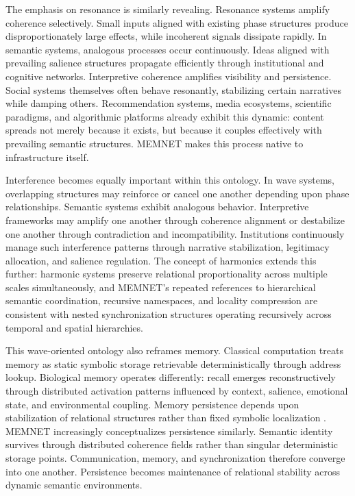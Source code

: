 \documentclass[11pt,a4paper]{article}
\begin{document}
The emphasis on resonance is similarly revealing. Resonance systems amplify coherence selectively. Small inputs aligned with existing phase structures produce disproportionately large effects, while incoherent signals dissipate rapidly. In semantic systems, analogous processes occur continuously. Ideas aligned with prevailing salience structures propagate efficiently through institutional and cognitive networks. Interpretive coherence amplifies visibility and persistence. Social systems themselves often behave resonantly, stabilizing certain narratives while damping others. Recommendation systems, media ecosystems, scientific paradigms, and algorithmic platforms already exhibit this dynamic: content spreads not merely because it exists, but because it couples effectively with prevailing semantic structures. MEMNET makes this process native to infrastructure itself.

Interference becomes equally important within this ontology. In wave systems, overlapping structures may reinforce or cancel one another depending upon phase relationships. Semantic systems exhibit analogous behavior. Interpretive frameworks may amplify one another through coherence alignment or destabilize one another through contradiction and incompatibility. Institutions continuously manage such interference patterns through narrative stabilization, legitimacy allocation, and salience regulation. The concept of harmonics extends this further: harmonic systems preserve relational proportionality across multiple scales simultaneously, and MEMNET's repeated references to hierarchical semantic coordination, recursive namespaces, and locality compression are consistent with nested synchronization structures operating recursively across temporal and spatial hierarchies.

This wave-oriented ontology also reframes memory. Classical computation treats memory as static symbolic storage retrievable deterministically through address lookup. Biological memory operates differently: recall emerges reconstructively through distributed activation patterns influenced by context, salience, emotional state, and environmental coupling. Memory persistence depends upon stabilization of relational structures rather than fixed symbolic localization \cite{hutchins1995}. MEMNET increasingly conceptualizes persistence similarly. Semantic identity survives through distributed coherence fields rather than singular deterministic storage points. Communication, memory, and synchronization therefore converge into one another. Persistence becomes maintenance of relational stability across dynamic semantic environments.
\end{document}
